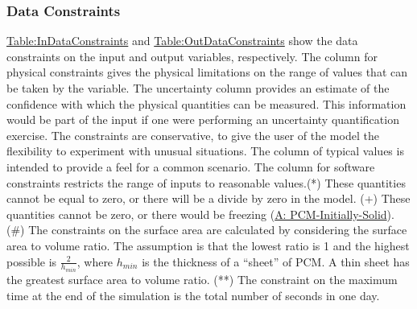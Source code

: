\documentclass[12pt]{article}
\begin{document}
\subsubsection{Data Constraints}
\label{Sec:DataConstraints}
\hyperref[Table:InDataConstraints]{Table:InDataConstraints} and \hyperref[Table:OutDataConstraints]{Table:OutDataConstraints} show the data constraints on the input and output variables, respectively. The column for physical constraints gives the physical limitations on the range of values that can be taken by the variable. The uncertainty column provides an estimate of the confidence with which the physical quantities can be measured. This information would be part of the input if one were performing an uncertainty quantification exercise. The constraints are conservative, to give the user of the model the flexibility to experiment with unusual situations. The column of typical values is intended to provide a feel for a common scenario. The column for software constraints restricts the range of inputs to reasonable values.(*) These quantities cannot be equal to zero, or there will be a divide by zero in the model. (+) These quantities cannot be zero, or there would be freezing (\hyperref[A:PCM-Initially-Solid]{A: PCM-Initially-Solid}). (\#) The constraints on the surface area are calculated by considering the surface area to volume ratio. The assumption is that the lowest ratio is 1 and the highest possible is $\frac{2}{{h_{min}}}$, where ${h_{min}}$ is the thickness of a ``sheet'' of PCM. A thin sheet has the greatest surface area to volume ratio. (**) The constraint on the maximum time at the end of the simulation is the total number of seconds in one day.
\end{document}
